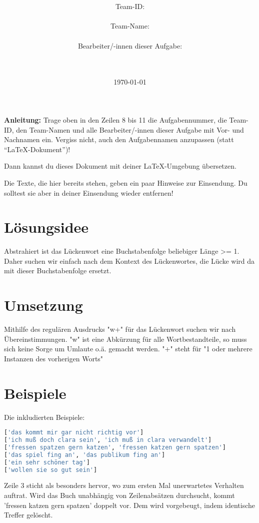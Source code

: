 \documentclass[a4paper,10pt,ngerman]{scrartcl}
\title{\textbf{\Huge\Aufgabe}}
\author{\LARGE Team-ID: \LARGE \TeamId \\\\
	    \LARGE Team-Name: \LARGE \TeamName \\\\
	    \LARGE Bearbeiter/-innen dieser Aufgabe: \\
	    \LARGE \Namen\\\\}
\date{\LARGE\today}
\begin{document}
\maketitle
\tableofcontents

\vspace{0.5cm}

\textbf{Anleitung:} Trage oben in den Zeilen 8 bis 11 die Aufgabennummer, die Team-ID, den Team-Namen und alle Bearbeiter/-innen dieser Aufgabe mit Vor- und Nachnamen ein.
Vergiss nicht, auch den Aufgabennamen anzupassen (statt "`\LaTeX-Dokument"')!

Dann kannst du dieses Dokument mit deiner \LaTeX-Umgebung übersetzen.

Die Texte, die hier bereits stehen, geben ein paar Hinweise zur
Einsendung. Du solltest sie aber in deiner Einsendung wieder entfernen!

\section{Lösungsidee}
Abstrahiert ist das Lückenwort eine Buchstabenfolge beliebiger Länge >= 1. Daher suchen wir einfach nach dem Kontext des Lückenwortes, die Lücke wird da mit dieser Buchstabenfolge ersetzt.

\section{Umsetzung}
Mithilfe des regulären Ausdrucks "w+" für das Lückenwort suchen wir nach Übereinstimmungen. "w" ist eine Abkürzung für alle Wortbestandteile, so muss sich keine Sorge um Umlaute o.ä. gemacht werden. "+" steht für "1 oder mehrere Instanzen des vorherigen Worts"

\section{Beispiele}
Die inkludierten Beispiele:
\begin{lstlisting}[language=Python]
['das kommt mir gar nicht richtig vor']
['ich muß doch clara sein', 'ich muß in clara verwandelt']
['fressen spatzen gern katzen', 'fressen katzen gern spatzen']
['das spiel fing an', 'das publikum fing an']
['ein sehr schöner tag']
['wollen sie so gut sein']
\end{lstlisting}

Zeile 3 sticht als besonders hervor, wo zum ersten Mal unerwartetes Verhalten auftrat. Wird das Buch unabhängig von Zeilenabsätzen durchsucht, kommt 'fressen katzen gern spatzen' doppelt vor. Dem wird vorgebeugt, indem identische Treffer gelöscht.
\end{document}
